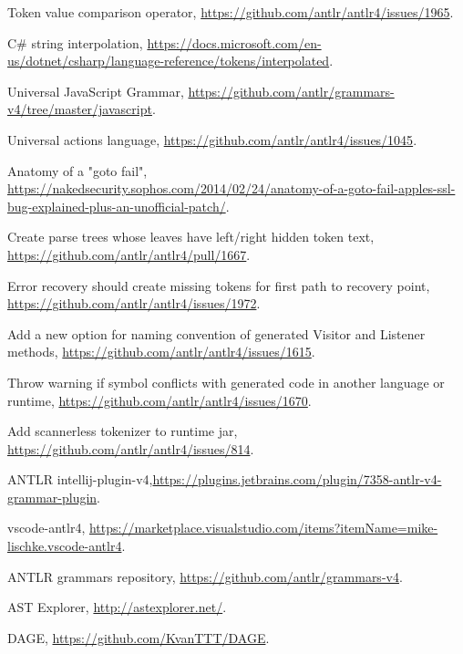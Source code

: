 \documentclass[sigplan,screen]{acmart}
\begin{document}
\begin{thebibliography}{}

 Token value comparison operator, \url{https://github.com/antlr/antlr4/issues/1965}.

 C\# string interpolation, \url{https://docs.microsoft.com/en-us/dotnet/csharp/language-reference/tokens/interpolated}.

 Universal JavaScript Grammar, \url{https://github.com/antlr/grammars-v4/tree/master/javascript}.

 Universal actions language, \url{https://github.com/antlr/antlr4/issues/1045}.

 Anatomy of a "goto fail", \url{https://nakedsecurity.sophos.com/2014/02/24/anatomy-of-a-goto-fail-apples-ssl-bug-explained-plus-an-unofficial-patch/}.

 Create parse trees whose leaves have left/right hidden token text, \url{https://github.com/antlr/antlr4/pull/1667}.

 Error recovery should create missing tokens for first path to recovery point, \url{https://github.com/antlr/antlr4/issues/1972}.

 Add a new option for naming convention of generated Visitor and Listener methods, \url{https://github.com/antlr/antlr4/issues/1615}.

 Throw warning if symbol conflicts with generated code in another language or runtime, \url{https://github.com/antlr/antlr4/issues/1670}.

 Add scannerless tokenizer to runtime jar, \url{https://github.com/antlr/antlr4/issues/814}.

 ANTLR intellij-plugin-v4,\url{https://plugins.jetbrains.com/plugin/7358-antlr-v4-grammar-plugin}.

 vscode-antlr4, \url{https://marketplace.visualstudio.com/items?itemName=mike-lischke.vscode-antlr4}.

 ANTLR grammars repository, \url{https://github.com/antlr/grammars-v4}.

 AST Explorer, \url{http://astexplorer.net/}.

 DAGE, \url{https://github.com/KvanTTT/DAGE}.

\end{thebibliography}
\end{document}
